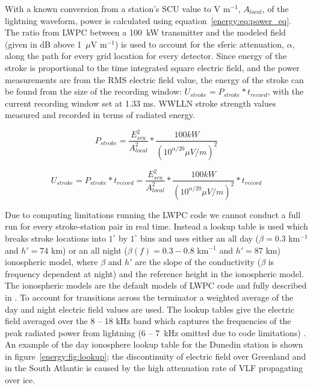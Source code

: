 With a known conversion from a station's SCU value to V m$^{-1}$, $A_{local}$, of the lightning waveform, power is calculated using equation~\ref{energy:eq:power_eq}.
The ratio from LWPC between a 100~kW transmitter and the modeled field (given in dB above 1~$\mu$V m$^{-1}$) is used to account for the sferic attenuation, $\alpha$, along the path for every grid location for every detector.
Since energy of the stroke is proportional to the time integrated square electric field, and the power measurements are from the RMS electric field value, the energy of the stroke can be found from the size of the recording window: $U_{stroke}=P_{stroke} * t_{record}$, with the current recording window set at 1.33 ms.
WWLLN stroke strength values measured and recorded in terms of radiated energy.

\begin{equation}
P_{stroke}=\frac{E_{scu}^2}{A_{local}^2} * \frac{100kW}{(10^{\alpha/20}\mu V/m)^2}
\label{energy:eq:power_eq}
\end{equation}

\begin{equation}
U_{stroke}= P_{stroke} * t_{record} = \frac{E_{scu}^2}{A_{local}^2} * \frac{100kW}{(10^{\alpha/20}\mu V/m)^2} * t_{record}
\label{energy:eq:energy_eq}
\end{equation}

Due to computing limitations running the LWPC code we cannot conduct a full run for every stroke-station pair in real time.
Instead a lookup table is used which breaks stroke locations into $1^{\circ}$ by $1^{\circ}$ bins and uses either an all day ($\beta=0.3$ km$^{-1}$ and $h'=74$ km) or an all night ($\beta(f)=0.3-0.8$ km$^{-1}$ and $h'=87$ km) ionospheric model, where $\beta$ and $h'$ are the slope of the conductivity ($\beta$ is frequency dependent at night) and the reference height in the ionospheric model.
The ionospheric models are the default models of LWPC code and fully described in \citet{Ferguson1998}. 
To account for transitions across the terminator a weighted average of the day and night electric field values are used.
The lookup tables give the electric field averaged over the 8 -- 18 kHz band which captures the frequencies of the peak radiated power from lightning (6 -- 7~kHz omitted due to code limitations) \citep{Volland1995}.
An example of the day ionosphere lookup table for the Dunedin station is shown in figure~\ref{energy:fig:lookup}; the discontinuity of electric field over Greenland and in the South Atlantic is caused by the high attenuation rate of VLF propagating over ice.

